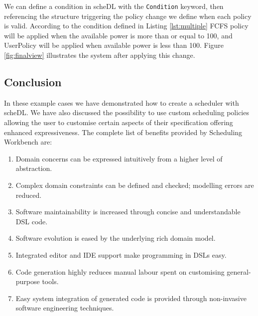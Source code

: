 	We can define a condition in \textsf{scheDL} with the 
	\texttt{Condition} keyword, then referencing the structure triggering the policy change we define when each
	policy is valid. According to the condition defined in Listing
	\ref{lst:multiple} FCFS policy will be applied when the available power is more than or equal to 100, and UserPolicy will be applied
	when available power is less than 100. Figure \ref{fig:finalview} illustrates the system after applying this change.
	
	\subsection{Conclusion}
	
		In these example cases we have demonstrated how to create a scheduler
		with \textsf{scheDL}. We have also discussed the possibility to use custom scheduling policies allowing the user to customise
		certain aspects of their specification offering enhanced expressiveness.	
		The complete list of benefits provided by Scheduling Workbench are: 
		
		\begin{enumerate}[{Benefit} 1]
		  \item Domain concerns can be expressed intuitively from a higher level of
		  abstraction.
		  \item Complex domain constraints can be defined and checked; modelling
		  errors are reduced.
		  \item Software maintainability is increased through concise and understandable
		  DSL code.
		  \item Software evolution is eased by the underlying rich domain model.
		  \item Integrated editor and IDE support make programming in DSLs easy.
		  \item Code generation highly reduces manual labour spent on customising
		  general-purpose tools.
		  \item Easy system integration of generated code is provided through
		  non-invasive software engineering techniques.
		\end{enumerate}
		

